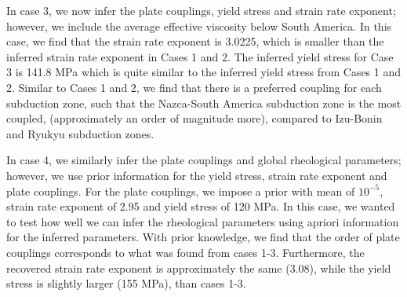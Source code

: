 \documentclass[12pt]{article}
\begin{document}
In case 3, we now infer the plate couplings, yield stress and strain rate exponent; however, we include the average effective viscosity below South America. In this case, we find that the strain rate exponent is 3.0225, which is smaller than the inferred strain rate exponent in Cases 1 and 2. The inferred yield stress for Case 3 is 141.8 MPa which is quite similar to the inferred yield stress from Cases 1 and 2. Similar to Cases 1 and 2, we find that there is a preferred coupling for each subduction zone, such that the Nazca-South America subduction zone is the most coupled, (approximately an order of magnitude more), compared to Izu-Bonin and Ryukyu subduction zones. %

In case 4, we similarly infer the plate couplings and global rheological parameters; however, we use prior information for the yield stress, strain rate exponent and plate couplings. For the plate couplings, we impose a prior with mean of $10^{-5}$, strain rate exponent of 2.95 and yield stress of 120 MPa. In this case, we wanted to test how well we can infer the rheological parameters using apriori information for the inferred parameters. With prior knowledge, we find that the order of plate couplings corresponds to what was found from cases 1-3. Furthermore, the recovered strain rate exponent is approximately the same (3.08), while the yield stress is slightly larger (155 MPa), than cases 1-3. 
\end{document}

